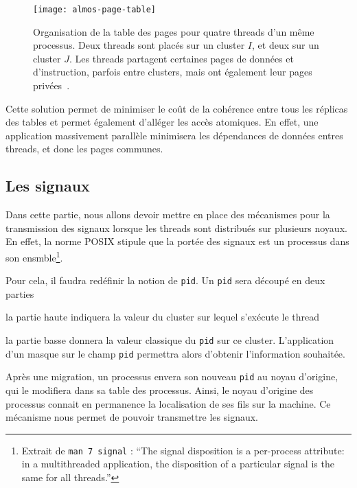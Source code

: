       \begin{figure}[ht]
        \centering
        \texttt{[image: almos-page-table]}
        \caption{Organisation de la table des pages pour quatre threads d'un
          même processus. Deux threads sont placés sur un cluster $I$, et deux
          sur un cluster $J$. Les threads partagent certaines pages de données
          et d'instruction, parfois entre clusters, mais ont également leur
          pages privées~\citep{almaless2014universite}.}
        \label{fig:almos-page-table}
      \end{figure}

      Cette solution permet de minimiser le coût de la cohérence entre tous les
      réplicas des tables et permet également d'alléger les accès atomiques. En
      effet, une application massivement parallèle minimisera les dépendances de
      données entres threads, et donc les pages communes.


    \subsection{Les signaux}

      Dans cette partie, nous allons devoir mettre en place des mécanismes pour
      la transmission des signaux lorsque les threads sont distribués sur
      plusieurs noyaux. En effet, la norme POSIX stipule que la portée des
      signaux est un processus dans son ensmble\footnote{Extrait de \texttt{man
          7 signal} : ``The signal disposition is a per-process attribute: in a
        multithreaded application, the disposition of a particular signal is the
        same for all threads.''}.

      Pour cela, il faudra redéfinir la notion de \texttt{pid}. Un \texttt{pid}
      sera découpé en deux parties \benumline \item la partie haute indiquera la
      valeur du cluster sur lequel s'exécute le thread \item la partie basse
      donnera la valeur classique du \texttt{pid} sur ce
      cluster\eenumline. L'application d'un masque sur le champ \texttt{pid}
      permettra alors d'obtenir l'information souhaitée.

      Après une migration, un processus envera son nouveau \texttt{pid} au noyau
      d'origine, qui le modifiera dans sa table des processus. Ainsi, le noyau
      d'origine des processus connait en permanence la localisation de ses fils
      sur la machine. Ce mécanisme nous permet de pouvoir transmettre les
      signaux.


